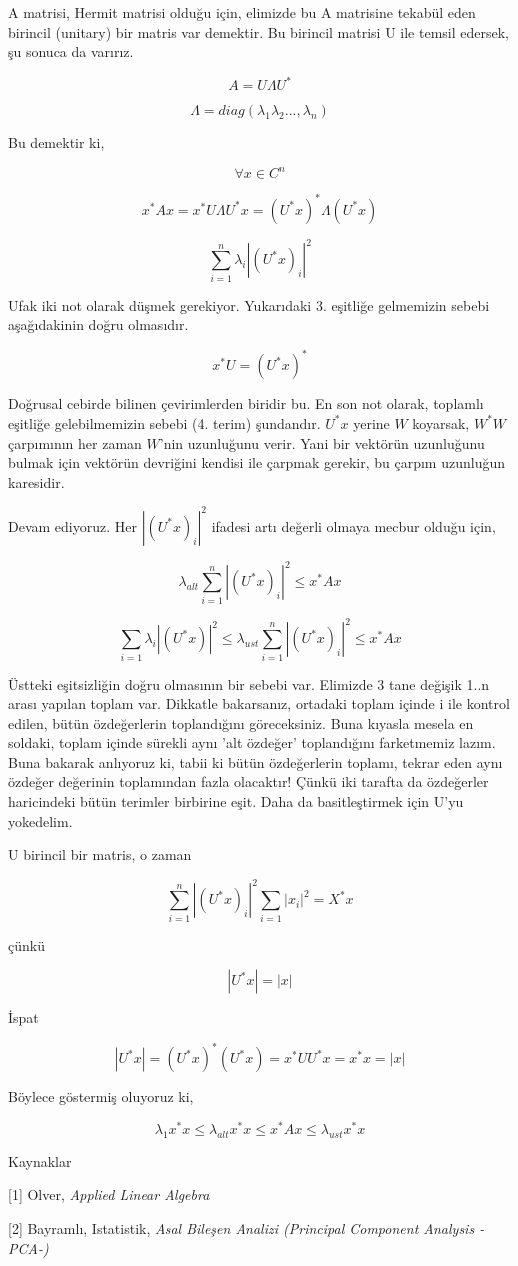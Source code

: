 \documentclass[12pt,fleqn]{article}\usepackage{../../common}
\begin{document}
A matrisi, Hermit matrisi olduğu için, elimizde bu A matrisine tekabül eden
birincil (unitary) bir matris var demektir. Bu birincil matrisi U ile
temsil edersek, şu sonuca da varırız.

$$ A = U \Lambda U^\ast $$

$$ \Lambda = diag(\lambda_1\lambda_2...,\lambda_n) $$

Bu demektir ki, 

$$ \forall x \in  C^n $$

$$ x^\ast A x = x^\ast U \Lambda U^\ast x = (U^\ast x)^\ast \Lambda(U^\ast x) $$

$$
\sum_{i=1}^n \lambda_i |(U^\ast x)_i|^2
$$

Ufak iki not olarak düşmek gerekiyor. Yukarıdaki 3. eşitliğe gelmemizin
sebebi aşağıdakinin doğru olmasıdır.

$$
x^\ast U = (U^\ast x)^\ast
$$

Doğrusal cebirde bilinen çevirimlerden biridir bu. En son not olarak, toplamlı
eşitliğe gelebilmemizin sebebi (4. terim) şundandır. $U^\ast x$ yerine $W$
koyarsak, $W^\ast W$ çarpımının her zaman $W$'nin uzunluğunu verir. Yani bir
vektörün uzunluğunu bulmak için vektörün devriğini kendisi ile çarpmak gerekir,
bu çarpım uzunluğun karesidir.

Devam ediyoruz. Her $|(U^\ast x)_i|^2$ ifadesi artı değerli olmaya mecbur
olduğu için,

$$
\lambda_{alt} \sum_{i=1}^n | (U^\ast x)_i |^2 \le x^\ast Ax 
$$

$$
\sum_{i=1} \lambda_i | (U^\ast x) |^2 \le
\lambda_{ust} \sum_{i=1}^n | (U^\ast x)_i|^2 \le
x^\ast Ax 
$$

Üstteki eşitsizliğin doğru olmasının bir sebebi var. Elimizde 3 tane
değişik 1..n arası yapılan toplam var. Dikkatle bakarsanız, ortadaki
toplam içinde i ile kontrol edilen, bütün özdeğerlerin toplandığını
göreceksiniz. Buna kıyasla mesela en soldaki, toplam içinde sürekli aynı
'alt özdeğer' toplandığını farketmemiz lazım. Buna bakarak anlıyoruz ki,
tabii ki bütün özdeğerlerin toplamı, tekrar eden aynı özdeğer değerinin
toplamından fazla olacaktır! Çünkü iki tarafta da özdeğerler haricindeki
bütün terimler birbirine eşit. Daha da basitleştirmek için U'yu yokedelim.

U birincil bir matris, o zaman

$$
\sum_{i=1}^{n} |(U^{\ast} x)_{i}|^{2}
\sum_{i=1} | x_{i} |^2 = X^{\ast} x
$$

çünkü

$$
|U^\ast x| = |x|
$$

İspat

$$
|U^\ast x| = (U^\ast x)^\ast(U^\ast x) = x^\ast UU^\ast x = x^\ast x = | x |
$$

Böylece göstermiş oluyoruz ki, 

$$
\lambda_1 x^\ast x \le \lambda_{alt} x^\ast x \le x^\ast Ax \le \lambda_{ust}
x^\ast x
$$ 

Kaynaklar

[1] Olver, {\em Applied Linear Algebra}

[2] Bayramlı, Istatistik, {\em Asal Bileşen Analizi (Principal Component Analysis -PCA-)}
\end{document}
